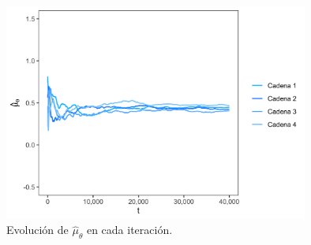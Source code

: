 \documentclass[11pt,a4paper]{article}
\begin{document}
\begin{figure}[!p]
\centering\includegraphics[width=10cm]{theta_ergodic_means.png}
\caption{Evolución de $\hat{\mu}_{\theta}$ en cada iteración.}
\label{fig:theta_means}
\end{figure}

%
%
%
\end{document}
